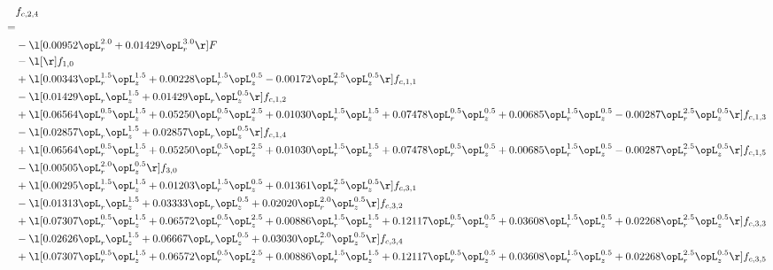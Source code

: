 \begin{alignat}{2} 
\label{eq:f_24_1} 
& f_{c,2,4} \nonumber \\ 
 = \\ 
& - \l[  0.00952 \opL_r^{2.0} +  0.01429 \opL_r^{3.0}  \r] F \nonumber \\ 
& - \l[  \r] f_{1,0} \nonumber \\ 
& + \l[  0.00343 \opL_r^{1.5} \opL_z^{1.5} +  0.00228 \opL_r^{1.5} \opL_z^{0.5}   -0.00172 \opL_r^{2.5} \opL_z^{0.5}  \r] f_{c,1,1} \nonumber \\ 
& - \l[  0.01429 \opL_r \opL_z^{1.5} +  0.01429 \opL_r \opL_z^{0.5}  \r] f_{c,1,2} \nonumber \\ 
& + \l[  0.06564 \opL_r^{0.5} \opL_z^{1.5} +  0.05250 \opL_r^{0.5} \opL_z^{2.5} +  0.01030 \opL_r^{1.5} \opL_z^{1.5} +  0.07478 \opL_r^{0.5} \opL_z^{0.5} +  0.00685 \opL_r^{1.5} \opL_z^{0.5}   -0.00287 \opL_r^{2.5} \opL_z^{0.5}  \r] f_{c,1,3} \nonumber \\ 
& - \l[  0.02857 \opL_r \opL_z^{1.5} +  0.02857 \opL_r \opL_z^{0.5}  \r] f_{c,1,4} \nonumber \\ 
& + \l[  0.06564 \opL_r^{0.5} \opL_z^{1.5} +  0.05250 \opL_r^{0.5} \opL_z^{2.5} +  0.01030 \opL_r^{1.5} \opL_z^{1.5} +  0.07478 \opL_r^{0.5} \opL_z^{0.5} +  0.00685 \opL_r^{1.5} \opL_z^{0.5}   -0.00287 \opL_r^{2.5} \opL_z^{0.5}  \r] f_{c,1,5} \nonumber \\ 
& - \l[  0.00505 \opL_r^{2.0} \opL_z^{0.5}  \r] f_{3,0} \nonumber \\ 
& + \l[  0.00295 \opL_r^{1.5} \opL_z^{1.5} +  0.01203 \opL_r^{1.5} \opL_z^{0.5} +  0.01361 \opL_r^{2.5} \opL_z^{0.5}  \r] f_{c,3,1} \nonumber \\ 
& - \l[  0.01313 \opL_r \opL_z^{1.5} +  0.03333 \opL_r \opL_z^{0.5} +  0.02020 \opL_r^{2.0} \opL_z^{0.5}  \r] f_{c,3,2} \nonumber \\ 
& + \l[  0.07307 \opL_r^{0.5} \opL_z^{1.5} +  0.06572 \opL_r^{0.5} \opL_z^{2.5} +  0.00886 \opL_r^{1.5} \opL_z^{1.5} +  0.12117 \opL_r^{0.5} \opL_z^{0.5} +  0.03608 \opL_r^{1.5} \opL_z^{0.5} +  0.02268 \opL_r^{2.5} \opL_z^{0.5}  \r] f_{c,3,3} \nonumber \\ 
& - \l[  0.02626 \opL_r \opL_z^{1.5} +  0.06667 \opL_r \opL_z^{0.5} +  0.03030 \opL_r^{2.0} \opL_z^{0.5}  \r] f_{c,3,4} \nonumber \\ 
& + \l[  0.07307 \opL_r^{0.5} \opL_z^{1.5} +  0.06572 \opL_r^{0.5} \opL_z^{2.5} +  0.00886 \opL_r^{1.5} \opL_z^{1.5} +  0.12117 \opL_r^{0.5} \opL_z^{0.5} +  0.03608 \opL_r^{1.5} \opL_z^{0.5} +  0.02268 \opL_r^{2.5} \opL_z^{0.5}  \r] f_{c,3,5} \nonumber \\ 

\end{alignat}
